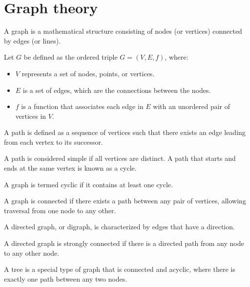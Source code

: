 \section{Graph theory}

A graph is a mathematical structure consisting of nodes (or vertices) connected by edges (or lines).
\begin{definition}
    Let $G$ be defined as the ordered triple $G=(V, E, f)$, where:
\end{definition}
\begin{itemize}
    \item $V$ represents a set of nodes, points, or vertices. 
    \item $E$ is a set of edges, which are the connections between the nodes.
    \item $f$ is a function that associates each edge in $E$ with an unordered pair of vertices in $V$. 
\end{itemize}
\begin{definition}
    A path is defined as a sequence of vertices such that there exists an edge leading from each vertex to its successor. 
\end{definition}
A path is considered simple if all vertices are distinct. 
A path that starts and ends at the same vertex is known as a cycle.
\begin{definition}
    A graph is termed cyclic if it contains at least one cycle.
\end{definition}
\begin{definition}
    A graph is connected if there exists a path between any pair of vertices, allowing traversal from one node to any other. 
\end{definition}
\begin{definition}
    A directed graph, or digraph, is characterized by edges that have a direction.
\end{definition}
\begin{definition}
    A directed graph is strongly connected if there is a directed path from any node to any other node.
\end{definition}
\begin{definition}
    A tree is a special type of graph that is connected and acyclic, where there is exactly one path between any two nodes.
\end{definition}

